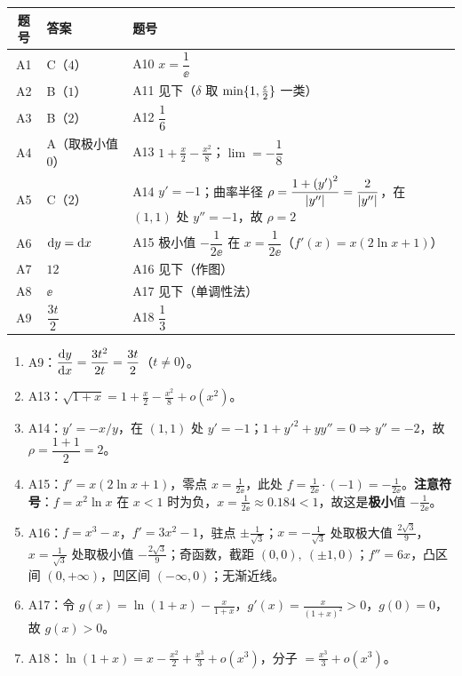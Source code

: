 \begin{center}
\small\setlength{\tabcolsep}{5pt}
\begin{tabularx}{\linewidth}{c|p{3.9cm}|X}
\toprule
题号 & 答案 & 题号\\
\midrule
A1 & C（$4$）& A10 $x=\dfrac{1}{\ee}$\\
A2 & B（$1$）& A11 见下（$\delta$ 取 $\min\{1,\frac{\varepsilon}{2}\}$ 一类）\\
A3 & B（$2$）& A12 $\dfrac{1}{6}$\\
A4 & A（取极小值 $0$）& A13 $1+\frac{x}{2}-\frac{x^{2}}8$；$\lim=-\dfrac{1}{8}$\\
A5 & C（$2$）& A14 $y'=-1$；曲率半径 $\rho=\dfrac{1+\left(y'\right)^{2}}{\left\lvert y''\right\rvert}=\dfrac{2}{\left\lvert y''\right\rvert}$，在 $(1,1)$ 处 $y''=-1$，故 $\rho=2$\\
A6 & $\mathrm{d} y=\mathrm{d} x$ & A15 极小值 $-\dfrac{1}{2\ee}$ 在 $x=\dfrac{1}{2\ee}$（$f'(x)=x(2\ln x+1)$）\\
A7 & $12$ & A16 见下（作图）\\
A8 & $\ee$ & A17 见下（单调性法）\\
A9 & $\dfrac{3t}{2}$ & A18 $\dfrac{1}{3}$\\
\bottomrule
\end{tabularx}
\end{center}

\begin{methodbox}[A 卷关键步骤]
\begin{enumerate}
\item A9：$\dfrac{\mathrm{d} y}{\mathrm{d} x}=\dfrac{3t^{2}}{2t}=\dfrac{3t}{2}$（$t\neq0$）。
\item A13：$\sqrt{1+x}=1+\frac{x}{2}-\frac{x^{2}}8+o(x^{2})$。
\item A14：$y'=-x/y$，在 $(1,1)$ 处 $y'=-1$；$1+y'^{2}+yy''=0\Rightarrow y''=-2$，故 $\rho=\dfrac{1+1}{2}=2$。
\item A15：$f'=x(2\ln x+1)$，零点 $x=\frac1{2\ee}$，此处 $f=\frac{1}{2\ee}\cdot\left(-1\right)=-\frac{1}{2\ee}$。\textbf{注意符号}：$f=x^{2}\ln x$ 在 $x<1$ 时为负，$x=\frac1{2\ee}\approx0.184<1$，故这是\textbf{极小}值 $-\frac{1}{2\ee}$。
\item A16：$f=x^{3}-x$，$f'=3x^{2}-1$，驻点 $\pm\frac1{\sqrt3}$；$x=-\frac1{\sqrt3}$ 处取极大值 $\frac{2\sqrt3}9$，$x=\frac1{\sqrt3}$ 处取极小值 $-\frac{2\sqrt3}9$；奇函数，截距 $(0,0),\ (\pm1,0)$；$f''=6x$，凸区间 $(0,+\infty)$，凹区间 $(-\infty,0)$；无渐近线。
\item A17：令 $g(x)=\ln(1+x)-\frac{x}{1+x}$，$g'(x)=\frac{x}{(1+x)^{2}}>0$，$g(0)=0$，故 $g(x)>0$。
\item A18：$\ln(1+x)=x-\frac{x^{2}}2+\frac{x^{3}}3+o(x^{3})$，分子 $=\frac{x^{3}}3+o(x^{3})$。
\end{enumerate}
\end{methodbox}

